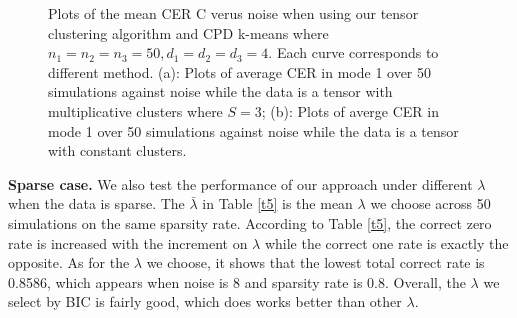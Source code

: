 \documentclass{article}
\begin{document}
\begin{figure}
	\centering
	\caption{Plots of the mean CER C verus noise when using our tensor clustering algorithm and CPD k-means where $n_1=n_2=n_3=50, d_1=d_2=d_3=4$. Each curve corresponds to different method. (a): Plots of average CER in mode 1 over 50 simulations against noise while the  data is a tensor with multiplicative clusters where $S=3$; (b): Plots of averge CER in mode 1 over 50 simulations against noise while the data is a tensor with constant clusters.}
	\label{fig4}
\end{figure}



\textbf{Sparse case.} We also test the performance of our approach under different $\lambda$ when the data is sparse. The $\bar{\lambda}$ in Table \ref{t5} is the mean $\lambda$ we choose across 50 simulations on the same sparsity rate. According to Table \ref{t5}, the correct zero rate is increased with the increment on $\lambda$ while the correct one rate is exactly the opposite. As for the $\lambda$ we choose, it shows that the lowest total correct rate is 0.8586, which appears when noise is 8 and sparsity rate is 0.8. Overall, the $\lambda$ we select by BIC is fairly good, which does works better than other $\lambda$.
\end{document}
